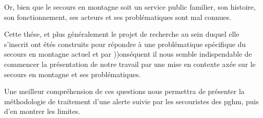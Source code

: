 Or, bien que le secours en montagne soit un service public familier,
son histoire, son fonctionnement, ses acteurs et ses problématiques
sont mal connues.

Cette thése, et plus généralement le projet de recherche au sein
duquel elle s'inscrit ont étés construits pour répondre à une
problématique spécifique du secours en montagne actuel et par
))onséquent il nous semble indispendable de commencer la présentation
de notre travail par une mise en contexte axée sur le secours en
montagne et ses problématiques.

Une meilleur compréhension de ces questions nous permettra de
présenter la méthodologie de traitement d'une alerte suivie par les
secouristes des \ac{pghm}, puis d'en montrer les limites.